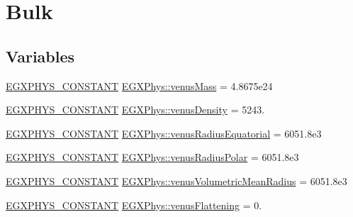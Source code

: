\hypertarget{group___e_g_x_phys-_constants-_astrophysics-_solar_system-_venus-_bulk}{}\section{Bulk}
\label{group___e_g_x_phys-_constants-_astrophysics-_solar_system-_venus-_bulk}
\subsection*{Variables}
\begin{DoxyCompactItemize}
\item 
\mbox{\hyperlink{group___e_g_x_phys-_constants-_macros_ga76980d288494ce1714c9ac68a95ba702}{E\+G\+X\+P\+H\+Y\+S\+\_\+\+C\+O\+N\+S\+T\+A\+NT}} \mbox{\hyperlink{group___e_g_x_phys-_constants-_astrophysics-_solar_system-_venus-_bulk_ga5331daa7cd2abe77e1fa8ad9e3534f7d}{E\+G\+X\+Phys\+::venus\+Mass}} = 4.\+8675e24
\item 
\mbox{\hyperlink{group___e_g_x_phys-_constants-_macros_ga76980d288494ce1714c9ac68a95ba702}{E\+G\+X\+P\+H\+Y\+S\+\_\+\+C\+O\+N\+S\+T\+A\+NT}} \mbox{\hyperlink{group___e_g_x_phys-_constants-_astrophysics-_solar_system-_venus-_bulk_gac9827d3838ac8fcd5b4d01df3ac85d01}{E\+G\+X\+Phys\+::venus\+Density}} = 5243.
\item 
\mbox{\hyperlink{group___e_g_x_phys-_constants-_macros_ga76980d288494ce1714c9ac68a95ba702}{E\+G\+X\+P\+H\+Y\+S\+\_\+\+C\+O\+N\+S\+T\+A\+NT}} \mbox{\hyperlink{group___e_g_x_phys-_constants-_astrophysics-_solar_system-_venus-_bulk_gab2414fa95cfd785f97810f384d9c3554}{E\+G\+X\+Phys\+::venus\+Radius\+Equatorial}} = 6051.\+8e3
\item 
\mbox{\hyperlink{group___e_g_x_phys-_constants-_macros_ga76980d288494ce1714c9ac68a95ba702}{E\+G\+X\+P\+H\+Y\+S\+\_\+\+C\+O\+N\+S\+T\+A\+NT}} \mbox{\hyperlink{group___e_g_x_phys-_constants-_astrophysics-_solar_system-_venus-_bulk_gaa2e9fd69a5627d4eb46749d8245bf9c0}{E\+G\+X\+Phys\+::venus\+Radius\+Polar}} = 6051.\+8e3
\item 
\mbox{\hyperlink{group___e_g_x_phys-_constants-_macros_ga76980d288494ce1714c9ac68a95ba702}{E\+G\+X\+P\+H\+Y\+S\+\_\+\+C\+O\+N\+S\+T\+A\+NT}} \mbox{\hyperlink{group___e_g_x_phys-_constants-_astrophysics-_solar_system-_venus-_bulk_gabd7816eaaceacd8631dffbbc1fdfcb06}{E\+G\+X\+Phys\+::venus\+Volumetric\+Mean\+Radius}} = 6051.\+8e3
\item 
\mbox{\hyperlink{group___e_g_x_phys-_constants-_macros_ga76980d288494ce1714c9ac68a95ba702}{E\+G\+X\+P\+H\+Y\+S\+\_\+\+C\+O\+N\+S\+T\+A\+NT}} \mbox{\hyperlink{group___e_g_x_phys-_constants-_astrophysics-_solar_system-_venus-_bulk_ga1fa2321d7cd6c55bc48dc191719d580d}{E\+G\+X\+Phys\+::venus\+Flattening}} = 0.

\end{DoxyCompactItemize}
